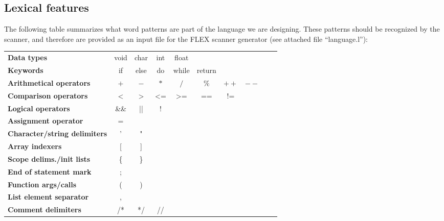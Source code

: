\subsection{Lexical features}
The following table summarizes what word patterns are part of the language we are designing.
These patterns should be recognized by the scanner, and therefore are provided as an input file
for the FLEX \cite{FLEX} scanner generator (see attached file ``language.l''):

\begin{tabular}{lccccccccc}
\textbf{Data types}                      & void & char & int & float &         &      &      &   &   \\
\textbf{Keywords}                        & if   & else & do  & while & return  &      &      &   &   \\
\textbf{Arithmetical operators}          & $+$  & $-$  & $*$ & $/$   & $\%$    & $++$ & $--$ &   &   \\
\textbf{Comparison operators}            & <    & >    & <=  & >=    & ==      & !=   &      &   &   \\
\textbf{Logical operators}               & \&\& & ||   & !   &       &         &      &      &   &   \\
\textbf{Assignment operator}             & =    &      &     &       &         &      &      &   &   \\
\textbf{Character/string delimiters}     & '    & "    &     &       &         &      &      &   &   \\
\textbf{Array indexers}                  & [    & ]    &     &       &         &      &      &   &   \\
\textbf{Scope delims./init lists}        & \{   & \}   &     &       &         &      &      &   &   \\
\textbf{End of statement mark}           & ;    &      &     &       &         &      &      &   &   \\
\textbf{Function args/calls}             & (    & )    &     &       &         &      &      &   &   \\
\textbf{List element separator}          & ,    &      &     &       &         &      &      &   &   \\
\textbf{Comment delimiters}              & /*   & */   & //  &       &         &      &      &   &   \\
\end{tabular}

